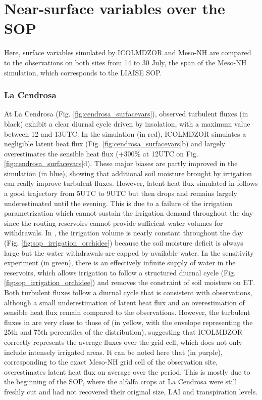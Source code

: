 \section{Near-surface variables over the SOP}
\label{sec:sop}

Here, surface variables simulated by ICOLMDZOR and Meso-NH are compared to the observations on both sites from 14 to 30 July, the span of the Meso-NH simulation, which corresponds to the LIAISE SOP.

\subsubsection*{La Cendrosa}
At La Cendrosa (Fig. \ref{fig:cendrosa_surfacevars}), observed turbulent fluxes (in black) exhibit a clear diurnal cycle driven by insolation, with a maximum value between 12 and 13UTC.
In the \noirr simulation (in red), ICOLMDZOR simulates a negligible latent heat flux (Fig. \ref{fig:cendrosa_surfacevars}b) and largely overestimates the sensible heat flux (+300\% at 12UTC on Fig. \ref{fig:cendrosa_surfacevars}d). 
These major biases are partly improved in the \irr simulation (in blue), showing that additional soil moisture brought by irrigation can really improve turbulent fluxes. However, latent heat flux simulated in \irr follows a good trajectory from 5UTC to 9UTC but then drops and remains largely underestimated until the evening. This is due to a failure of the irrigation parametrization which cannot sustain the irrigation demand throughout the day since the routing reservoirs cannot provide sufficient water volumes for withdrawals. In \irr, the irrigation volume is nearly constant throughout the day (Fig. \ref{fig:sop_irrigation_orchidee}) because the soil moisture deficit is always large but the water withdrawals are capped by available water.
In the \irrboost sensitivity experiment (in green), there is an effectively infinite supply of water in the reservoirs, which allows irrigation to follow a structured diurnal cycle (Fig. \ref{fig:sop_irrigation_orchidee}) and removes the constraint of soil moisture on ET. Both turbulent fluxes follow a diurnal cycle that is consistent with observations, although a small underestimation of latent heat flux and an overestimation of sensible heat flux remain compared to the observations. 
However, the turbulent fluxes in \irrboost are very close to those of \mesomean (in yellow, with the envelope representing the 25th and 75th percentiles of the distribution), suggesting that ICOLMDZOR correctly represents the average fluxes over the grid cell, which does not only include intensely irrigated areas.
It can be noted here that \mesoexact (in purple), corresponding to the exact Meso-NH grid cell of the observation site, overestimates latent heat flux on average over the period. This is mostly due to the beginning of the SOP, where the alfalfa crops at La Cendrosa were still freshly cut and had not recovered their original size, LAI and transpiration levels.

